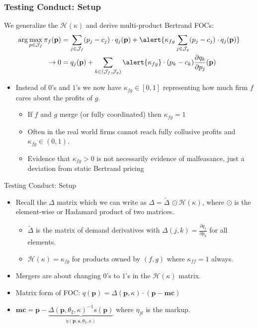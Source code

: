 \documentclass[xcolor=pdftex,dvipsnames,table,mathserif,aspectratio=169]{beamer}
\begin{document}
\begin{frame}
\frametitle{Testing Conduct: Setup}
\small
We generalize the $\mathcal{H}(\kappa)$ and derive multi-product Bertrand FOCs:
\begin{align*}
\arg \max_{p \in \mathcal{J}_f} \pi_f (\mathbf{p}) &= \sum_{j \in \mathcal{J}_f} (p_j - c_j) \cdot q_j(\mathbf{p}) +  \alert{\kappa_{fg} \sum_{j \in \mathcal{J}_g} (p_j - c_j) \cdot q_j(\mathbf{p})} \\
\rightarrow 0&= q_j(\mathbf{p}) + \sum_{k \in (\mathcal{J}_f,\mathcal{J}_g)} \alert{\kappa_{fg}}\cdot (p_k - c_k) \frac{\partial q_{k}}{\partial p_j}(\mathbf{p}) 
\end{align*}
\begin{itemize}
\item Instead of $0$'s and $1$'s we now have $\kappa_{fg} \in [0,1]$ representing how much firm $f$ cares about the profits of $g$.
\begin{itemize}
\item If $f$ and $g$ merge (or fully coordinated) then $\kappa_{fg} =1$
\item Often in the real world firms cannot reach fully collusive profits and $\kappa_{fg} \in (0,1)$.
\item Evidence that $\kappa_{fg} > 0$ is not necessarily evidence of malfeasance, just a deviation from \alert{static Bertrand pricing}
\end{itemize}
\end{itemize}
\end{frame}


\begin{frame}{Testing Conduct: Setup}
\begin{itemize}
\item Recall the $\Delta$ matrix which we can write as $\Delta=\tilde{\Delta}\, \odot \mathcal{H}(\kappa)$, where $\odot$ is the element-wise or Hadamard product of two matrices. 
\begin{itemize}
\item $\tilde{\Delta}$ is the matrix of demand derivatives with $\Delta{(j,k)} = \frac{\partial q_j}{\partial p_k}$ for all elements.
\item $\mathcal{H}(\kappa)=\kappa_{fg}$ for products owned by $(f,g)$ where $\kappa_{ff}=1$ always.
\end{itemize}
\item Mergers are about changing $0$'s to $1$'s in the $\mathcal{H}(\kappa)$ matrix.
\item Matrix form of FOC: $q(\mathbf{p}) = \Delta(\mathbf{p},\kappa)\cdot(\mathbf{p}-\mathbf{mc})$
\item $\mathbf{mc} =  \mathbf{p} - \underbrace{\Delta(\mathbf{p}, \theta_2, \kappa)^{-1} s(\mathbf{p})}_{\eta(\mathbf{p},\mathbf{s},\theta_2,\kappa)}$
where $\eta_{jt}$ is the markup.
\end{itemize}
\end{frame}
\end{document}
